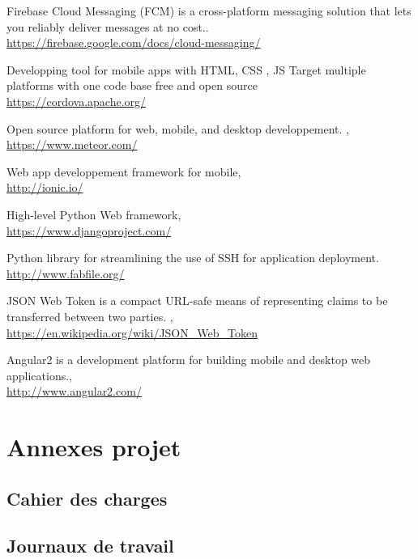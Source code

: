 \documentclass[french]{article}
\begin{document}
	\begin{thebibliography}{9}
		
		Firebase Cloud Messaging (FCM) is a cross-platform messaging solution that lets you reliably deliver messages at no cost..\\ \url{https://firebase.google.com/docs/cloud-messaging/}
		
		Developping tool for mobile apps with HTML, CSS , JS Target multiple platforms with one code base free and open source\\ \url{https://cordova.apache.org/}
		
		Open source platform for web, mobile, and desktop developpement. ,\\ \url{https://www.meteor.com/}
		
		Web app developpement framework for mobile,\\ \url{http://ionic.io/}
		
		High-level Python Web framework, \\ \url{https://www.djangoproject.com/}
		
		Python library for streamlining the use of SSH for application deployment.\\ \url{http://www.fabfile.org/}
		
		JSON Web Token is a compact URL-safe means of representing claims to be transferred between two parties. ,\\ \url{https://en.wikipedia.org/wiki/JSON_Web_Token}
		
		Angular2 is a development platform for building mobile and desktop web applications.,\\ \url{http://www.angular2.com/}
	\end{thebibliography}
			
	\newpage
		
		
	\section{Annexes projet}
		\subsection{Cahier des charges}
			
		\subsection{Journaux de travail}
			
\end{document}
